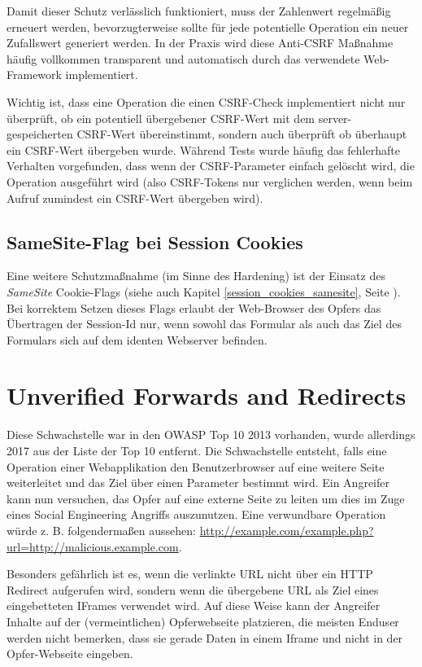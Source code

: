 Damit dieser Schutz verlässlich funktioniert, muss der Zahlenwert regelmäßig erneuert werden, bevorzugterweise sollte für jede potentielle Operation ein neuer Zufallswert generiert werden. In der Praxis wird diese Anti-CSRF Maßnahme häufig vollkommen transparent und automatisch durch das verwendete Web-Framework implementiert.

Wichtig ist, dass eine Operation die einen CSRF-Check implementiert nicht nur überprüft, ob ein potentiell übergebener CSRF-Wert mit dem server-gespeicherten CSRF-Wert übereinstimmt, sondern auch überprüft ob überhaupt ein CSRF-Wert übergeben wurde. Während Tests wurde häufig das fehlerhafte Verhalten vorgefunden, dass wenn der CSRF-Parameter einfach gelöscht wird, die Operation ausgeführt wird (also CSRF-Tokens nur verglichen werden, wenn beim Aufruf zumindest ein CSRF-Wert übergeben wird).

\subsection{SameSite-Flag bei Session Cookies}

Eine weitere Schutzmaßnahme (im Sinne des Hardening) ist der Einsatz des \textit{SameSite} Cookie-Flags (siehe auch Kapitel \ref{session_cookies_samesite}, Seite \pageref{session_cookies_samesite}). Bei korrektem Setzen dieses Flags erlaubt der Web-Browser des Opfers das Übertragen der Session-Id nur, wenn sowohl das Formular als auch das Ziel des Formulars sich auf dem identen Webserver befinden.

\section{Unverified Forwards and Redirects}

Diese Schwachstelle war in den OWASP Top 10 2013 vorhanden, wurde allerdings 2017 aus der Liste der Top 10 entfernt. Die Schwachstelle entsteht, falls eine Operation einer Webapplikation den Benutzerbrowser auf eine weitere Seite weiterleitet und das Ziel über einen Parameter bestimmt wird. Ein Angreifer kann nun versuchen, das Opfer auf eine externe Seite zu leiten um dies im Zuge eines Social Engineering Angriffs auszunutzen. Eine verwundbare Operation würde z. B. folgendermaßen aussehen: \url{http://example.com/example.php?url=http://malicious.example.com}.

Besonders gefährlich ist es, wenn die verlinkte URL nicht über ein HTTP Redirect aufgerufen wird, sondern wenn die übergebene URL als Ziel eines eingebetteten IFrames verwendet wird. Auf diese Weise kann der Angreifer Inhalte auf der (vermeintlichen) Opferwebseite platzieren, die meisten Enduser werden nicht bemerken, dass sie gerade Daten in einem Iframe und nicht in der Opfer-Webseite eingeben.

